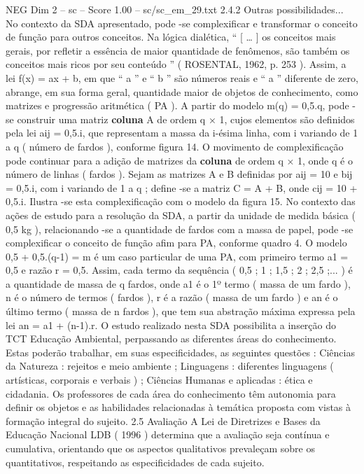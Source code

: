\begin{textsample}{NEG Dim 2 – sc – Score 1.00 – sc/sc\_em\_29.txt}  \label{ex:f2_neg_272}
2.4.2 Outras possibilidades...
No contexto da SDA apresentado, pode -se complexificar e transformar o conceito de função para outros conceitos.
Na lógica dialética, “ [ … ] os conceitos mais gerais, por refletir a essência de maior quantidade de fenômenos, são também os conceitos mais ricos por seu conteúdo ” ( ROSENTAL, 1962, p. 253 ).
Assim, a lei f(x) = ax + b, em que “ a ” e “ b ” são números reais e “ a ” diferente de zero, abrange, em sua forma geral, quantidade maior de objetos de conhecimento, como matrizes e progressão aritmética ( PA ).
A partir do modelo m(q) = 0,5.q, pode -se construir uma matriz \textbf{coluna} A de ordem q × 1, cujos elementos são definidos pela lei aij = 0,5.i, que representam a massa da i-ésima linha, com i variando de 1 a q ( número de fardos ), conforme figura 14.
O movimento de complexificação pode continuar para a adição de matrizes da \textbf{coluna} de ordem q × 1, onde q é o número de linhas ( fardos ).
Sejam as matrizes A e B definidas por aij = 10 e bij = 0,5.i, com i variando de 1 a q ; define -se a matriz C = A + B, onde cij = 10 + 0,5.i.
Ilustra -se esta complexificação com o modelo da figura 15.
No contexto das ações de estudo para a resolução da SDA, a partir da unidade de medida básica ( 0,5 kg ), relacionando -se a quantidade de fardos com a massa de papel, pode -se complexificar o conceito de função afim para PA, conforme quadro 4.
O modelo 0,5 + 0,5.(q-1) = m é um caso particular de uma PA, com primeiro termo a1 = 0,5 e razão r = 0,5.
Assim, cada termo da sequência ( 0,5 ; 1 ; 1,5 ; 2 ; 2,5 ;... ) é a quantidade de massa de q fardos, onde a1 é o 1º termo ( massa de um fardo ), n é o número de termos ( fardos ), r é a razão ( massa de um fardo ) e an é o último termo ( massa de n fardos ), que tem sua abstração máxima expressa pela lei an = a1 + (n-1).r.
O estudo realizado nesta SDA possibilita a inserção do TCT Educação Ambiental, perpassando as diferentes áreas do conhecimento.
Estas poderão trabalhar, em suas especificidades, as seguintes questões : Ciências da Natureza : rejeitos e meio ambiente ; Linguagens : diferentes linguagens ( artísticas, corporais e verbais ) ; Ciências Humanas e aplicadas : ética e cidadania.
Os professores de cada área do conhecimento têm autonomia para definir os objetos e as habilidades relacionadas à temática proposta com vistas à formação integral do sujeito. 2.5 Avaliação A Lei de Diretrizes e Bases da Educação Nacional LDB ( 1996 ) determina que a avaliação seja contínua e cumulativa, orientando que os aspectos qualitativos prevaleçam sobre os quantitativos, respeitando as especificidades de cada sujeito.

\end{textsample}
